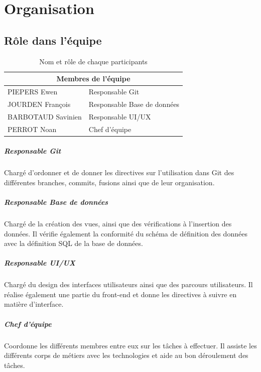 \documentclass[french,12pt,a4paper,titlepage]{report}
\begin{document}
	\chapter{Organisation}
	\section{Rôle dans l'équipe}
	\begin{table}[h]
		\centering
		\begin{tabular}{|l|l|}
			\hline
			\multicolumn{2}{|c|}{Membres de l'équipe} \\
			\hline
			PIEPERS Ewen & Responsable Git  \tabularnewline
			JOURDEN François & Responsable Base de données  \tabularnewline
			BARBOTAUD Savinien & Responsable UI/UX  \tabularnewline
			PERROT Noan & Chef d'équipe  \tabularnewline
			\hline
		\end{tabular}
		\caption{Nom et rôle de chaque participants}
	\end{table}
	\paragraph{Responsable Git}
	Chargé d'ordonner et de donner les directives sur l'utilisation dans Git des différentes branches, commits, fusions ainsi que de leur organisation.
	\paragraph{Responsable Base de données}
	Chargé de la création des vues, ainsi que des vérifications à l'insertion des données. Il vérifie également la conformité du schéma de définition des données avec la définition SQL de la base de données.
	\paragraph{Responsable UI/UX}
	Chargé du design des interfaces utilisateurs ainsi que des parcours utilisateurs. Il réalise également une partie du front-end et donne les directives à suivre en matière d'interface.
	\paragraph{Chef d'équipe}
	Coordonne les différents membres entre eux sur les tâches à effectuer. Il assiste les différents corps de métiers avec les technologies et aide au bon déroulement des tâches.
\end{document}
